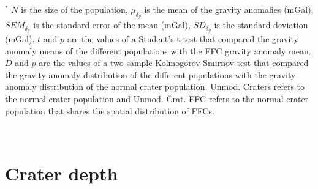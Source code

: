 \begin{table}
{\begin{tabular}
{\begin{minipage}{18.5cm}
        \vspace{.1cm}  \footnotesize  $^*$  $N$  is the  size  of  the
        population,  $\mu_{\delta_g}$  is  the  mean  of  the  gravity
        anomalies (mGal),  $SEM_{\delta_g}$ is  the standard  error of
        the  mean (mGal),  $SD_{\delta_g}$ is  the standard  deviation
        (mGal).  $t$ and $p$ are the values of a Student's t-test that
        compared   the  gravity   anomaly  means   of  the   different
        populations with  the FFC gravity  anomaly mean.  $D$  and $p$
        are the  values of  a two-sample Kolmogorov-Smirnov  test that
        compared  the gravity  anomaly distribution  of the  different
        populations  with  the  gravity anomaly  distribution  of  the
        normal  crater  population.   Unmod.  Craters  refers  to  the
        normal crater population  and Unmod. Crat.  FFC  refers to the
        normal crater population that  shares the spatial distribution
        of FFCs.
      \end{minipage}
      }\\
    \end{tabular}}
    \label{Table3-1}
  \end{table}

\section{Crater depth}

